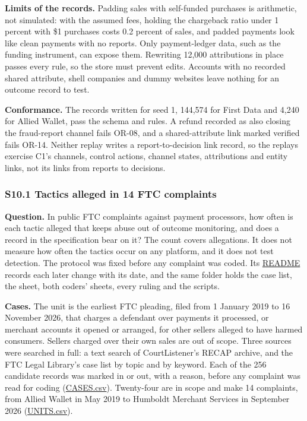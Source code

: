 \documentclass[
  11pt,
]{article}
\begin{document}
\textbf{Limits of the records.} Padding sales with self-funded purchases
is arithmetic, not simulated: with the assumed fees, holding the
chargeback ratio under 1 percent with \$1 purchases costs 0.2 percent of
sales, and padded payments look like clean payments with no reports.
Only payment-ledger data, such as the funding instrument, can expose
them. Rewriting 12,000 attributions in place passes every rule, so the
store must prevent edits. Accounts with no recorded shared attribute,
shell companies and dummy websites leave nothing for an outcome record
to test.

\textbf{Conformance.} The records written for seed 1, 144,574 for First
Data and 4,240 for Allied Wallet, pass the schema and rules. A refund
recorded as also closing the fraud-report channel fails \mbox{OR-08},
and a shared-attribute link marked verified fails \mbox{OR-14}. Neither
replay writes a report-to-decision link record, so the replays exercise
C1's channels, control actions, channel states, attributions and entity
links, not its links from reports to decisions.

\hypertarget{s10.1-tactics-alleged-in-14-ftc-complaints}{%
\subsubsection{S10.1 Tactics alleged in 14 FTC
complaints}\label{s10.1-tactics-alleged-in-14-ftc-complaints}}

\textbf{Question.} In public FTC complaints against payment processors,
how often is each tactic alleged that keeps abuse out of outcome
monitoring, and does a record in the specification bear on it? The count
covers allegations. It does not measure how often the tactics occur on
any platform, and it does not test detection. The protocol was fixed
before any complaint was coded. Its
\href{tools/complaint_audit/README.md}{README} records each later change
with its date, and the same folder holds the case list, the sheet, both
coders' sheets, every ruling and the scripts.

\textbf{Cases.} The unit is the earliest FTC pleading, filed from 1
January 2019 to 16 November 2026, that charges a defendant over payments
it processed, or merchant accounts it opened or arranged, for other
sellers alleged to have harmed consumers. Sellers charged over their own
sales are out of scope. Three sources were searched in full: a text
search of CourtListener's RECAP archive, and the FTC Legal Library's
case list by topic and by keyword. Each of the 256 candidate records was
marked in or out, with a reason, before any complaint was read for
coding (\href{tools/complaint_audit/CASES.csv}{CASES.csv}). Twenty-four
are in scope and make 14 complaints, from Allied Wallet in May 2019 to
Humboldt Merchant Services in September 2026
(\href{tools/complaint_audit/UNITS.csv}{UNITS.csv}).
\end{document}

